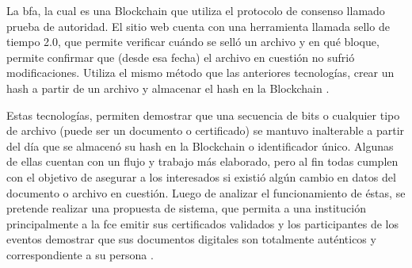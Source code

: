 





 La \gls{bfa}, la cual es una  Blockchain que utiliza el protocolo de consenso llamado  prueba de autoridad. El sitio web cuenta con una herramienta llamada sello de tiempo 2.0, que permite verificar cuándo se  selló un archivo y en qué bloque,
permite confirmar que (desde esa fecha) el archivo en cuestión no sufrió modificaciones. Utiliza el mismo método que las anteriores tecnologías, 
crear un hash a partir de un archivo y almacenar el hash en la Blockchain \cite[]{Blockchain_federal_argentina_bfa_2020}.

Estas tecnologías, permiten demostrar que una secuencia de bits o cualquier tipo de archivo (puede ser
 un documento o certificado) se mantuvo inalterable a partir del día que se almacenó su hash en la Blockchain o identificador único. Algunas de ellas 
cuentan con un flujo y trabajo más elaborado, pero al fin todas cumplen con el objetivo de asegurar a los interesados si existió algún cambio en datos
del documento o archivo en cuestión. 
Luego de analizar el funcionamiento de éstas, se pretende realizar una propuesta de sistema, que permita a una institución principalmente 
a la \gls{fce} emitir sus certificados validados y los participantes de los eventos  demostrar que sus 
 documentos digitales son totalmente auténticos y correspondiente  a su persona \cite[]{opencerts_gestion_nodate,blockcerts_faq_nodate,Blockchain_federal_argentina_bfa_2020}. 

